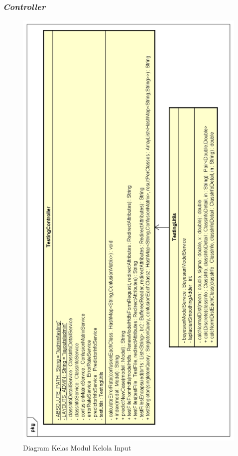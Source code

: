 \subsubsection{\textit{Controller}}
\begin{figure}[H]
	\centering
	\includegraphics[scale=0.75]{ClassDiagramLengkap/Klasifikasi/Simple_CD_Klasifikasi_Controller_Utils}
	\caption[Diagram Kelas Modul Kelola Input]{Diagram Kelas Modul Kelola Input}
	\label{fig:Diagram Kelas Modul Kelola Input}
\end{figure}

